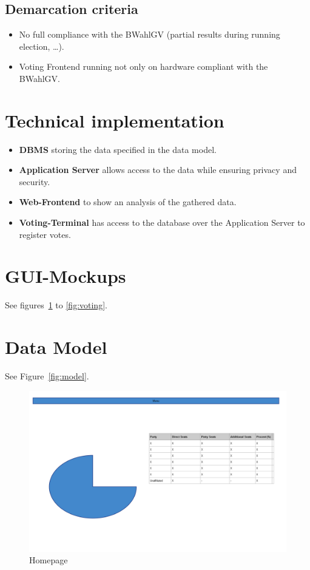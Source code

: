 \documentclass[10pt,a4paper]{article}
\begin{document}
\subsection{Demarcation criteria}
	\begin{itemize}
		\item No full compliance with the BWahlGV (partial results during running election, \dots).
		\item Voting Frontend running not only on hardware compliant with the BWahlGV.
	\end{itemize}
	
	
\section{Technical implementation}
	\begin{itemize}
		\item \textbf{DBMS} storing the data specified in the data model.
		\item \textbf{Application Server} allows access to the data while ensuring privacy and security.
		\item \textbf{Web-Frontend} to show an analysis of the gathered data.
		\item \textbf{Voting-Terminal} has access to the database over the Application Server to register votes.
	\end{itemize}

\section{GUI-Mockups}
See figures~\ref{fig:hp} to \ref{fig:voting}.

\section{Data Model}
See Figure~\ref{fig:model}.

\newpage


\begin{figure}
	\centering
	\includegraphics[scale=.3]{HomePage.png}
	\caption{Homepage}
	\label{fig:hp}
\end{figure}
\end{document}
